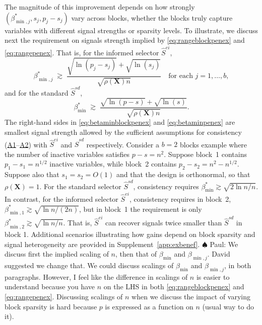 \documentclass[
  12pt]{article}
\newcommand{\paul}[1]{{\small{\color{green} \sf $\spadesuit$ Paul: #1}}}
\newcommand{\bz}{\boldsymbol{z}}
\newcommand{\bX}{\mathbf{X}}
\begin{document}
The magnitude of this improvement depends on how strongly $(\beta_{\min,j}^*, s_j, p_j-s_j)$ vary across blocks, whether the blocks truly capture variables with different signal strengths or sparsity levels. %
To illustrate, \color{green}we discuss next the requirement on signals strength implied by \eqref{eq:rangeblockpenex} and \eqref{eq:rangepenex}. That is,
for the informed selector $\hat S^{ei}$,
\begin{equation}\label{eq:betaminblockpenex}
\beta^*_{\min,j}
\;\gtrsim\;
\frac{\sqrt{\ln(p_j-s_j)}+\sqrt{\ln(s_j)}}{\sqrt{\rho(\bX)n}}\quad\text{for each }j=1,\ldots,b,
\end{equation}
and for the standard $\hat S^{sd}$,
\begin{equation}\label{eq:betaminpenex}
\beta^*_{\min}
\;\gtrsim\;
\frac{\sqrt{\ln(p-s)}+\sqrt{\ln(s)}}{\sqrt{\rho(\bX)n}}.
\end{equation}
The right-hand sides in \eqref{eq:betaminblockpenex} and \eqref{eq:betaminpenex} are smallest signal strength allowed by the sufficient assumptions for consistency (\hyperlink{lab:A1}{A1}–\hyperlink{lab:A2}{A2}) with $\hat S^{ei}$ and $\hat S^{sd}$ respectively.\color{black}  Consider a $b=2$ blocks example where the number of inactive variables satisfies \color{green}$p-s=n^2$\color{black}.
Suppose block~1 contains \color{green}$p_1-s_1=n^{1/2}$ \color{black} inactive variables, while block~2 contains \color{green}$p_2-s_2=n^{2}-n^{1/2}$\color{black}.
Suppose also that $s_1=s_2=O(1)$ and that the design is orthonormal, so that $\rho(\bX)=1$. \color{green}For the standard selector $\hat S^{sd}$, consistency requires $\beta^*_{\min}\gtrsim\sqrt{2\ln n / n}$.
In contrast, for the informed selector $\hat S^{ei}$, consistency requires in block~2, $\beta^*_{\min,1}\gtrsim\sqrt{\ln n / (2n)}$, but in block~1 the requirement is only $\beta^*_{\min,2}\gtrsim\sqrt{\ln n / n}$. That is, $\hat S^{ei}$ can recover signals twice smaller than $\hat S^{sd}$ in block 1. \color{black}Additional scenarios illustrating how gains depend on block sparsity and signal heterogeneity are provided in Supplement~\ref{app:exbenef}.\paul{We discuss first the implied scaling of $n$, then that of $\beta_{\min}$ and $\beta_{\min,j}$. David suggested we change that. We could discuss scalings of $\beta_{\min}$ and $\beta_{\min,j}$, in both paragraphs. However, I feel like the difference in scalings of $n$ is easier to understand because you have $n$ on the LHS in both \eqref{eq:rangeblockpenex} and \eqref{eq:rangepenex}. Discussing scalings of $n$ when we discuss the impact of varying block sparsity is hard because $p$ is expressed as a function on $n$ (usual way to do it).}
\end{document}
